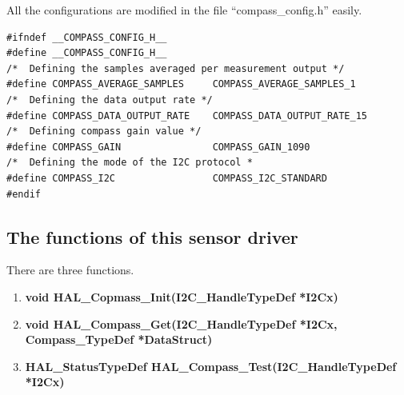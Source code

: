 All the configurations are modified in the file “compass\_config.h” easily.

\begin{lstlisting}
#ifndef __COMPASS_CONFIG_H__
#define __COMPASS_CONFIG_H__
/*	Defining the samples averaged per measurement output */
#define COMPASS_AVERAGE_SAMPLES		COMPASS_AVERAGE_SAMPLES_1
/*	Defining the data output rate */
#define COMPASS_DATA_OUTPUT_RATE	COMPASS_DATA_OUTPUT_RATE_15
/*	Defining compass gain value */
#define	COMPASS_GAIN				COMPASS_GAIN_1090
/*	Defining the mode of the I2C protocol *
#define COMPASS_I2C					COMPASS_I2C_STANDARD
#endif
\end{lstlisting}

\subsection{The functions of this sensor driver}
There are three functions.
\begin{enumerate}
    \item \textbf{void HAL\_Copmass\_Init(I2C\_HandleTypeDef *I2Cx)}
    \item \textbf{void HAL\_Compass\_Get(I2C\_HandleTypeDef *I2Cx, Compass\_TypeDef *DataStruct)}
    \item \textbf{HAL\_StatusTypeDef HAL\_Compass\_Test(I2C\_HandleTypeDef *I2Cx)}
\end{enumerate}


